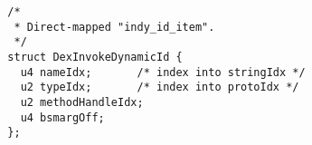 {\scriptsize \begin{verbatim}
  /*
   * Direct-mapped "indy_id_item".
   */
  struct DexInvokeDynamicId {
    u4 nameIdx;       /* index into stringIdx */
    u2 typeIdx;       /* index into protoIdx */
    u2 methodHandleIdx;
    u4 bsmargOff;
  };
\end{verbatim} }
